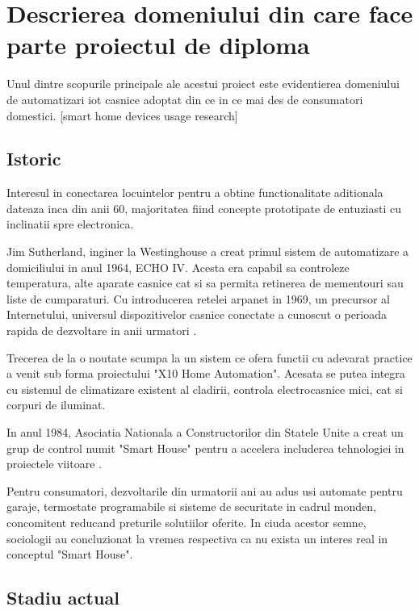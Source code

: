 \section {Descrierea domeniului din care face parte proiectul de diploma}

Unul dintre scopurile principale ale acestui proiect este evidentierea domeniului de automatizari \acrshort{iot} casnice adoptat din ce in ce mai des de consumatori domestici. [smart home devices usage research]

\subsection {Istoric}

Interesul in conectarea locuintelor pentru a obtine functionalitate aditionala dateaza inca din anii 60, majoritatea fiind concepte prototipate de entuziasti cu inclinatii spre electronica.

Jim Sutherland, inginer la Westinghouse a creat primul sistem de automatizare a domiciliului in anul 1964, ECHO IV. Acesta era capabil sa controleze temperatura, alte aparate casnice cat si sa permita retinerea de mementouri sau liste de cumparaturi. Cu introducerea retelei \acrfull{arpanet} in 1969, un precursor al Internetului, universul dispozitivelor casnice conectate a cunoscut o perioada rapida de dezvoltare in anii urmatori \cite{ZeusIntegratedSystems}.

Trecerea de la o noutate scumpa la un sistem ce ofera functii cu adevarat practice a venit sub forma proiectului "X10 Home Automation". Acesata se putea integra cu sistemul de climatizare existent al cladirii, controla electrocasnice mici, cat si corpuri de iluminat.

In anul 1984, Asociatia Nationala a Constructorilor din Statele Unite a creat un grup de control numit "Smart House" pentru a accelera includerea tehnologiei in proiectele viitoare \cite{Aldrich2003Smart}.

Pentru consumatori, dezvoltarile din urmatorii ani au adus usi automate pentru garaje, termostate programabile si sisteme de securitate in cadrul monden, concomitent reducand preturile solutiilor oferite. In ciuda acestor semne, sociologii au concluzionat la vremea respectiva ca nu exista un interes real in conceptul "Smart House".


\subsection {Stadiu actual}

